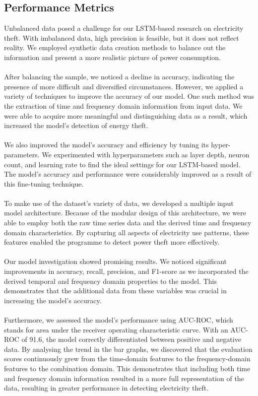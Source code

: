 \documentclass{ieeeaccess}
\begin{document}
\subsection{Performance Metrics}
Unbalanced data posed a challenge for our LSTM-based research on electricity theft. With imbalanced data, high precision is feasible, but it does not reflect reality. We employed synthetic data creation methods to balance out the information and present a more realistic picture of power consumption.
\\
\\
After balancing the sample, we noticed a decline in accuracy, indicating the presence of more difficult and diversified circumstances. However, we applied a variety of techniques to improve the accuracy of our model. One such method was the extraction of time and frequency domain information from input data. We were able to acquire more meaningful and distinguishing data as a result, which increased the model's detection of energy theft.
\\
\\
We also improved the model's accuracy and efficiency by tuning its hyper-parameters. We experimented with hyperparameters such as layer depth, neuron count, and learning rate to find the ideal settings for our LSTM-based model. The model's accuracy and performance were considerably improved as a result of this fine-tuning technique.
\\
\\
To make use of the dataset's variety of data, we developed a multiple input model architecture. Because of the modular design of this architecture, we were able to employ both the raw time series data and the derived time and frequency domain characteristics. By capturing all aspects of electricity use patterns, these features enabled the programme to detect power theft more effectively.
\\
\\
Our model investigation showed promising results. We noticed significant improvements in accuracy, recall, precision, and F1-score as we incorporated the derived temporal and frequency domain properties to the model. This demonstrates that the additional data from these variables was crucial in increasing the model's accuracy.
\\
\\
Furthermore, we assessed the model's performance using AUC-ROC, which stands for area under the receiver operating characteristic curve. With an AUC-ROC of 91.6, the model correctly differentiated between positive and negative data. By analysing the trend in the bar graphs, we discovered that the evaluation scores continuously grew from the time-domain features to the frequency-domain features to the combination domain. This demonstrates that including both time and frequency domain information resulted in a more full representation of the data, resulting in greater performance in detecting electricity theft.
\end{document}
